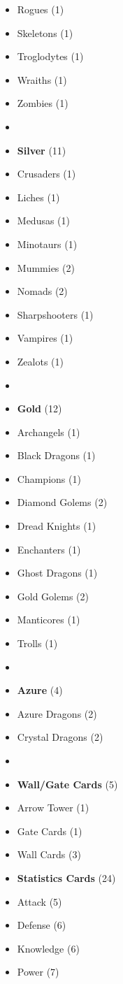 \begin{multicols*}{3}
\begin{itemize}[leftmargin=0pt, label={}, noitemsep]
  \item Rogues (1)
  \item Skeletons (1)
  \item Troglodytes (1)
  \item Wraiths (1)
  \item Zombies (1)
  \item
  \item \textbf{Silver} (11)
  \item Crusaders (1)
  \item Liches (1)
  \item Medusas (1)
  \item Minotaurs (1)
  \item Mummies (2)
  \item Nomads (2)
  \item Sharpshooters (1)
  \item Vampires (1)
  \item Zealots (1)
  \item
  \item \textbf{Gold} (12)
  \item Archangels (1)
  \item Black Dragons (1)
  \item Champions (1)
  \item Diamond Golems (2)
  \item Dread Knights (1)
  \item Enchanters (1)
  \item Ghost Dragons (1)
  \item Gold Golems (2)
  \item Manticores (1)
  \item Trolls (1)
  \item
  \item \textbf{Azure} (4)
  \item Azure Dragons (2)
  \item Crystal Dragons (2)
  \item
  \item \textbf{Wall/Gate Cards} (5)
  \item Arrow Tower (1)
  \item Gate Cards (1)
  \item Wall Cards (3)
\columnbreak
  \item \textbf{Statistics Cards} (24)
  \item Attack (5)
  \item Defense (6)
  \item Knowledge (6)
  \item Power (7)

\end{itemize}
\end{multicols*}
